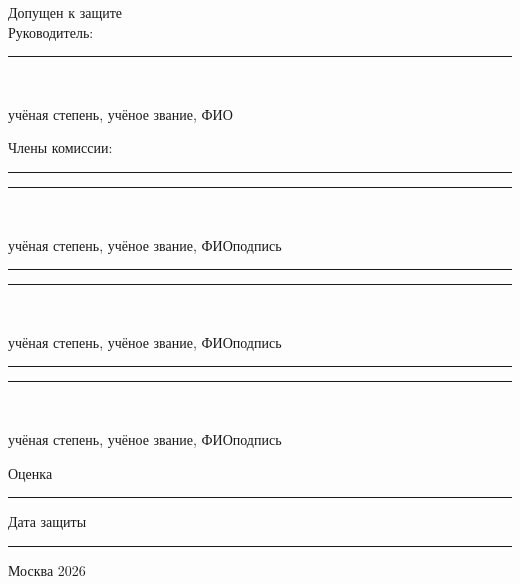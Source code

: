 \documentclass[14pt,a4paper,oneside]{extreport}
\begin{document}
\begin{titlepage}
\begin{flushright}
\begin{minipage}[t]{0.53\textwidth}
Допущен к защите\\
Руководитель:\par
\vspace{0.25cm}
\rule{5.2cm}{0.4pt}\\[-1pt]
{\fontsize{8.5}{9.5}\selectfont учёная степень, учёное звание, ФИО\par}
\vspace{0.25cm}
Члены комиссии:\par
\vspace{0.12cm}
\rule{3.65cm}{0.4pt}\hspace{0.18cm}\rule{1.05cm}{0.4pt}\\[-1pt]
{\fontsize{8}{9}\selectfont учёная степень, учёное звание, ФИО\hspace{0.25cm}подпись\par}
\vspace{0.12cm}
\rule{3.65cm}{0.4pt}\hspace{0.18cm}\rule{1.05cm}{0.4pt}\\[-1pt]
{\fontsize{8}{9}\selectfont учёная степень, учёное звание, ФИО\hspace{0.25cm}подпись\par}
\vspace{0.12cm}
\rule{3.65cm}{0.4pt}\hspace{0.18cm}\rule{1.05cm}{0.4pt}\\[-1pt]
{\fontsize{8}{9}\selectfont учёная степень, учёное звание, ФИО\hspace{0.25cm}подпись\par}
\vspace{0.25cm}
{\fontsize{10.5}{12}\selectfont Оценка \rule{4.2cm}{0.4pt}\par}
\vspace{0.18cm}
{\fontsize{10.5}{12}\selectfont Дата защиты \rule{3.6cm}{0.4pt}\par}
\end{minipage}
\end{flushright}
\vfill
\begin{center}{\fontsize{11}{13}\selectfont Москва 2026}\end{center}
\end{titlepage}

\setcounter{page}{2}
\tableofcontents
\clearpage










\end{document}
